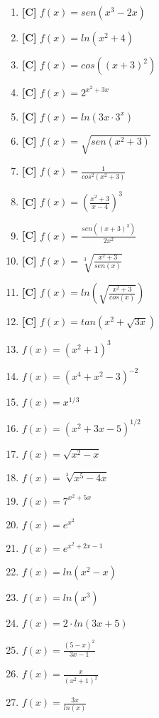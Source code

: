 \begin{enumerate}[label=a\alph*.,topsep=0pt]
	\item \textbf{[C]} $ f(x) = sen(x^3 -2x) $
	\item \textbf{[C]} $ f(x) = ln(x^2+4) $
	\item \textbf{[C]} $ f(x) = cos((x+3)^2) $
	\item \textbf{[C]} $ f(x) = 2^{x^2+3x} $
	\item \textbf{[C]} $ f(x) = ln(3x \cdot 3^x) $
	\item \textbf{[C]} $ f(x) = \sqrt{sen(x^2 +3)} $
	\item \textbf{[C]} $ f(x) =  \frac{1}{cos^2(x^2 + 3)}$
	\item \textbf{[C]} $ f(x) =  (\frac{x^2+3}{x-4})^3$
	\item \textbf{[C]} $ f(x) =  \frac{sen((x+3)^3)}{2x^2}$
	\item \textbf{[C]} $ f(x) =  \sqrt[3]{\frac{x^2+3}{sen(x)}}$
	\item \textbf{[C]} $ f(x) =  ln(\sqrt{\frac{x^2+3}{cos(x)}})$
	\item \textbf{[C]} $ f(x) = tan(x^2 + \sqrt{3x})$
	\item $ f(x) =  (x^2+1)^3$
	\item $ f(x) =  (x^4 +x^2 -3)^{-2}$
	\item $ f(x) =  x^{1/3}$
	\item $ f(x) =  (x^2+3x-5)^{1/2}$
	\item $ f(x) =  \sqrt{x^2-x}$
	\item $ f(x) =  \sqrt[3]{x^5-4x}$
	\item $ f(x) =  7^{x^2+5x}$
	\item $ f(x) =  e^{x^2}$
	\item $ f(x) =  e^{x^2+2x-1}$
	\item $ f(x) =  ln(x^2-x)$
	\item $ f(x) =  ln(x^3)$
	\item $ f(x) =  2 \cdot ln(3x+5)$
	\item $ f(x) =  \frac{(5-x)^2}{3x-1}$
	\item $ f(x) =  \frac{x}{(x^2+1)^2}$
	\item $ f(x) =  \frac{3x}{ln(x)}$
\end{enumerate}
